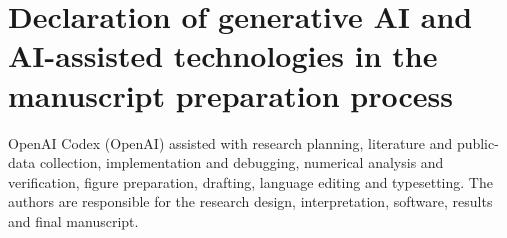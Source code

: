 \documentclass[11pt,a4paper]{article}
\begin{document}
\section*{Declaration of generative AI and AI-assisted technologies in the manuscript preparation process}
OpenAI Codex (OpenAI) assisted with research planning, literature and public-data collection, implementation and debugging, numerical analysis and verification, figure preparation, drafting, language editing and typesetting. The authors are responsible for the research design, interpretation, software, results and final manuscript.
\end{document}
